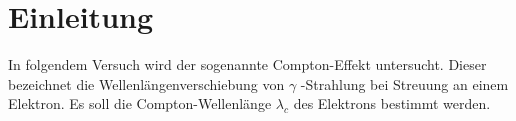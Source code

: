 \section{Einleitung}
\label{sec:einleitung}
In folgendem Versuch wird der sogenannte Compton-Effekt untersucht.
Dieser bezeichnet die Wellenlängenverschiebung von $\gamma$ -Strahlung bei Streuung an einem Elektron.
Es soll die Compton-Wellenlänge $\lambda_c$ des Elektrons bestimmt werden.
